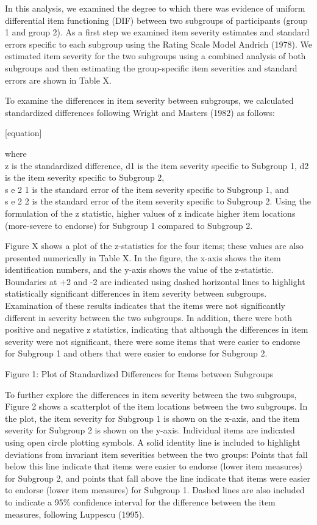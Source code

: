 \documentclass[
  letterpaper,
]{article}
\begin{document}
In this analysis, we examined the degree to which there was evidence of
uniform differential item functioning (DIF) between two subgroups of
participants (group 1 and group 2). As a first step we examined item
severity estimates and standard errors specific to each subgroup using
the Rating Scale Model Andrich (1978). We estimated item severity for
the two subgroups using a combined analysis of both subgroups and then
estimating the group-specific item severities and standard errors are
shown in Table X.

To examine the differences in item severity between subgroups, we
calculated standardized differences following Wright and Masters (1982)
as follows:

{[}equation{]}

where\\
z is the standardized difference, d1 is the item severity specific to
Subgroup 1, d2 is the item severity specific to Subgroup 2,\\
s e 2 1 is the standard error of the item severity specific to Subgroup
1, and\\
s e 2 2 is the standard error of the item severity specific to Subgroup
2. Using the formulation of the z statistic, higher values of z indicate
higher item locations (more-severe to endorse) for Subgroup 1 compared
to Subgroup 2.

Figure X shows a plot of the z-statistics for the four items; these
values are also presented numerically in Table X. In the figure, the
x-axis shows the item identification numbers, and the y-axis shows the
value of the z-statistic. Boundaries at +2 and -2 are indicated using
dashed horizontal lines to highlight statistically significant
differences in item severity between subgroups. Examination of these
results indicates that the items were not significantly different in
severity between the two subgroups. In addition, there were both
positive and negative z statistics, indicating that although the
differences in item severity were not significant, there were some items
that were easier to endorse for Subgroup 1 and others that were easier
to endorse for Subgroup 2.

Figure 1: Plot of Standardized Differences for Items between Subgroups

To further explore the differences in item severity between the two
subgroups, Figure 2 shows a scatterplot of the item locations between
the two subgroups. In the plot, the item severity for Subgroup 1 is
shown on the x-axis, and the item severity for Subgroup 2 is shown on
the y-axis. Individual items are indicated using open circle plotting
symbols. A solid identity line is included to highlight deviations from
invariant item severities between the two groups: Points that fall below
this line indicate that items were easier to endorse (lower item
measures) for Subgroup 2, and points that fall above the line indicate
that items were easier to endorse (lower item measures) for Subgroup 1.
Dashed lines are also included to indicate a 95\% confidence interval
for the difference between the item measures, following Luppescu (1995).
\end{document}
